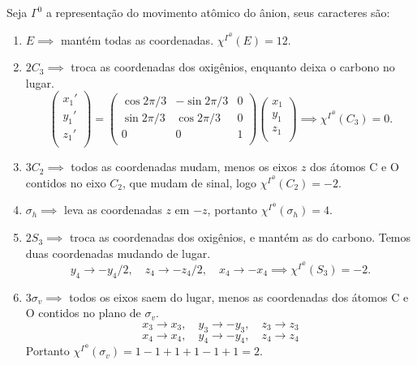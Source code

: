 \documentclass[a4paper,10pt]{article}
\newcommand{\mchi}{\chi^{\Gamma^0}}
\begin{document}
Seja $\Gamma^0$ a representação do movimento atômico do ânion, seus caracteres são:

\begin{enumerate}
\item $E \implies$ mantém todas as coordenadas. $\chi^{\Gamma^0}(E) = 12$.
\item $2 C_3 \implies$ troca as coordenadas dos oxigênios, enquanto deixa o carbono no lugar.
$$
\begin{pmatrix}
x_1' \\
y_1' \\
z_1' \\
\end{pmatrix}
=
\begin{pmatrix}
\cos2\pi/3 & -\sin2\pi/3 & 0 \\
\sin2\pi/3 &  \cos2\pi/3 & 0 \\
0 & 0 & 1 \\
\end{pmatrix}
\begin{pmatrix}
x_1 \\
y_1 \\
z_1 \\
\end{pmatrix}
\implies \chi^{\Gamma^0}(C_3) = 0.
$$
\item $3 C_2 \implies$ todos as coordenadas mudam, menos os eixos $z$ dos átomos C e O contidos no eixo $C_2$, que mudam de sinal, logo $\chi^{\Gamma^0}(C_2) = -2$.
\item $\sigma_h \implies$ leva as coordenadas $z$ em $-z$, portanto $\chi^{\Gamma^0}(\sigma_h) = 4$.
\item $2 S_3 \implies$ troca as coordenadas dos oxigênios, e mantém as do carbono. Temos duas coordenadas mudando de lugar.
$$
y_4 \to -y_4/2, \quad z_4 \to -z_4/2, \quad x_4 \to -x_4 \implies \mchi(S_3) = -2.
$$
\item $3 \sigma_v \implies$ todos os eixos saem do lugar, menos as coordenadas dos átomos C e O contidos no plano de $\sigma_v$.
$$
x_3 \to x_3, \quad y_3 \to -y_3, \quad z_3 \to z_3
$$
$$
x_4 \to x_4, \quad y_4 \to -y_4, \quad z_4 \to z_4
$$
Portanto $\mchi(\sigma_v) = 1 - 1 + 1 + 1 - 1 + 1  = 2$.
\end{enumerate}
\end{document}
